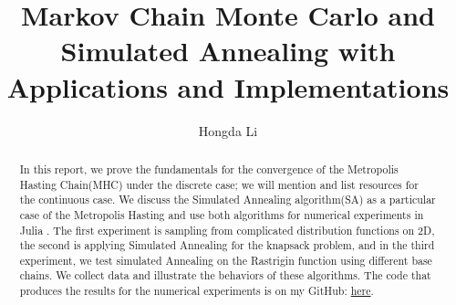 \documentclass[]{article}
\title{Markov Chain Monte Carlo and Simulated Annealing with Applications and Implementations}
\author{Hongda Li}
\theoremstyle{definition}
\begin{document}
\maketitle
\begin{abstract}
    In this report, we prove the fundamentals for the convergence of the Metropolis Hasting Chain(MHC) under the discrete case; we will mention and list resources for the continuous case. We discuss the Simulated Annealing algorithm(SA) as a particular case of the Metropolis Hasting and use both algorithms for numerical experiments in Julia \cite{article:julia}. The first experiment is sampling from complicated distribution functions on 2D, the second is applying Simulated Annealing for the knapsack problem, and in the third experiment, we test simulated Annealing on the Rastrigin function using different base chains. We collect data and illustrate the behaviors of these algorithms. The code that produces the results for the numerical experiments is on my GitHub: \href{https://github.com/iluvjava/Metropolis-Hasting}{here}. 
\end{abstract}

\end{document}
